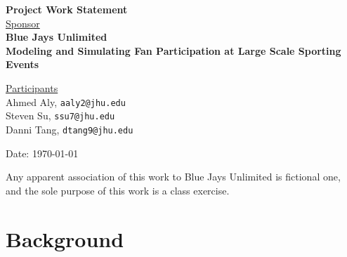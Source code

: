 \documentclass[12pt,letterpaper]{article}
\theoremstyle{definition}
\begin{document}
\def\shiftdowna{0.32in}  %
\def\shiftdownb{0.22in}  %


\begin{center}
\textbf{{\large Project Work Statement}}\\


\vspace \shiftdowna
\underline {Sponsor}\\ 
\vspace{5pt}
\textbf{{\large Blue Jays Unlimited}}\\


\vspace \shiftdowna
\textbf{{\large Modeling and Simulating Fan Participation at Large Scale Sporting Events}}


\vspace{0.35in}
\vspace \shiftdownb
\underline {Participants} \\
\vspace{5pt}
Ahmed Aly, \texttt{aaly2@jhu.edu}\\
\vspace{3pt}
Steven Su, \texttt{ssu7@jhu.edu}\\
\vspace{3pt}
Danni Tang, \texttt{dtang9@jhu.edu}


\vspace \shiftdowna
Date: \today

\end{center}

\vfill  
\footnoterule
\noindent \small{Any apparent association of this work to Blue Jays Unlimited is
fictional one, and the sole purpose of this work is a class exercise.}

\newpage

\section{Background}
\end{document}
